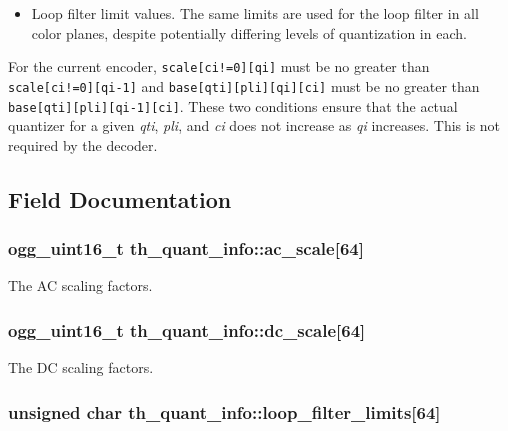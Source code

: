 \begin{itemize}
\item Loop filter limit values. The same limits are used for the loop filter in all color planes, despite potentially differing levels of quantization in each.\end{itemize}


For the current encoder, {\tt scale[ci!=0][qi]} must be no greater than {\tt scale[ci!=0][qi-1]} and {\tt base[qti][pli][qi][ci]} must be no greater than {\tt base[qti][pli][qi-1][ci]}. These two conditions ensure that the actual quantizer for a given {\em qti\/}, {\em pli\/}, and {\em ci\/} does not increase as {\em qi\/} increases. This is not required by the decoder. 



\subsection{Field Documentation}
\subsubsection{\setlength{\rightskip}{0pt plus 5cm}ogg\_\-uint16\_\-t \bf{th\_\-quant\_\-info::ac\_\-scale}[64]}\label{structth__quant__info_102f079c8f4a135dc0895c10768aeb06}


The AC scaling factors. 

\subsubsection{\setlength{\rightskip}{0pt plus 5cm}ogg\_\-uint16\_\-t \bf{th\_\-quant\_\-info::dc\_\-scale}[64]}\label{structth__quant__info_d5c1c0d1aa4127fcf864ae747d732ed9}


The DC scaling factors. 

\subsubsection{\setlength{\rightskip}{0pt plus 5cm}unsigned char \bf{th\_\-quant\_\-info::loop\_\-filter\_\-limits}[64]}\label{structth__quant__info_4ac56bf0a45b5743b36daf85d5cd9e33}


